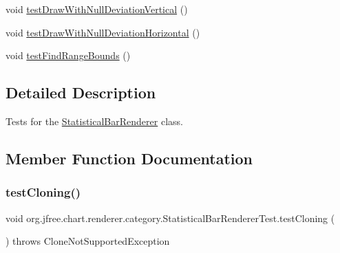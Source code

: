 \begin{DoxyCompactItemize}
\item 
void \mbox{\hyperlink{classorg_1_1jfree_1_1chart_1_1renderer_1_1category_1_1_statistical_bar_renderer_test_a7f3dda1fed0f7a19969c80fe05951b4c}{test\+Draw\+With\+Null\+Deviation\+Vertical}} ()
\item 
void \mbox{\hyperlink{classorg_1_1jfree_1_1chart_1_1renderer_1_1category_1_1_statistical_bar_renderer_test_a7d4102fb91077377276b6bd34d616158}{test\+Draw\+With\+Null\+Deviation\+Horizontal}} ()
\item 
void \mbox{\hyperlink{classorg_1_1jfree_1_1chart_1_1renderer_1_1category_1_1_statistical_bar_renderer_test_ab528d759e1ca701f586005d190f44248}{test\+Find\+Range\+Bounds}} ()
\end{DoxyCompactItemize}


\subsection{Detailed Description}
Tests for the \mbox{\hyperlink{classorg_1_1jfree_1_1chart_1_1renderer_1_1category_1_1_statistical_bar_renderer}{Statistical\+Bar\+Renderer}} class. 

\subsection{Member Function Documentation}
\mbox{\label{classorg_1_1jfree_1_1chart_1_1renderer_1_1category_1_1_statistical_bar_renderer_test_abb8b6a706b133c2bee540b1900d5dd85}} 
\subsubsection{\texorpdfstring{test\+Cloning()}{testCloning()}}
{\footnotesize\ttfamily void org.\+jfree.\+chart.\+renderer.\+category.\+Statistical\+Bar\+Renderer\+Test.\+test\+Cloning (\begin{DoxyParamCaption}{ }\end{DoxyParamCaption}) throws Clone\+Not\+Supported\+Exception}

